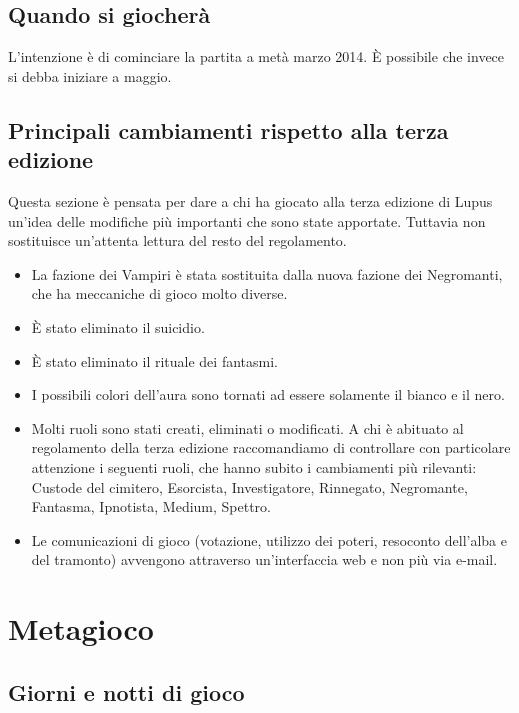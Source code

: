 \documentclass[a4paper,10pt]{article}
\begin{document}
\subsection{Quando si giocherà}

L'intenzione è di cominciare la partita a metà marzo 2014. È possibile che invece si debba iniziare a maggio.


\subsection{Principali cambiamenti rispetto alla terza edizione}

Questa sezione è pensata per dare a chi ha giocato alla terza edizione di Lupus un'idea delle modifiche più importanti che sono state apportate. Tuttavia non sostituisce un'attenta lettura del resto del regolamento.

\begin{itemize}
 \item La fazione dei Vampiri è stata sostituita dalla nuova fazione dei Negromanti, che ha meccaniche di gioco molto diverse.
 \item È stato eliminato il suicidio.
 \item È stato eliminato il rituale dei fantasmi.
 \item I possibili colori dell'aura sono tornati ad essere solamente il bianco e il nero.
 \item Molti ruoli sono stati creati, eliminati o modificati. A chi è abituato al regolamento della terza edizione raccomandiamo di controllare con particolare attenzione i seguenti ruoli, che hanno subito i cambiamenti più rilevanti: Custode del cimitero, Esorcista, Investigatore, Rinnegato, Negromante, Fantasma, Ipnotista, Medium, Spettro.
 \item Le comunicazioni di gioco (votazione, utilizzo dei poteri, resoconto dell'alba e del tramonto) avvengono attraverso un'interfaccia web e non più via e-mail.
\end{itemize}



\pagebreak
\section{Metagioco}

\subsection{Giorni e notti di gioco}
\end{document}
